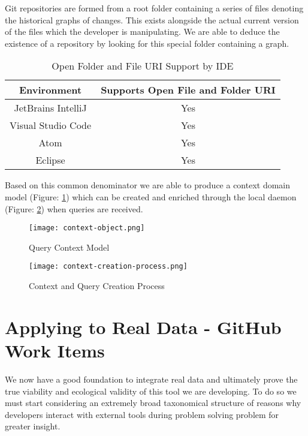 Git repositories are formed from a root folder containing a series of files denoting the historical graphs of changes. This exists alongside the actual current version of the files which the developer is manipulating. We are able to deduce the existence of a repository by looking for this special folder containing a graph.

\begin{table}[h!]
	\centering
	\begin{tabular}{|c|c|}
		\hline 
		Environment & Supports Open File and Folder URI \\ 
		\hline 
		\hline 
		JetBrains IntelliJ & Yes\\ 
		\hline 
		Visual Studio Code & Yes \\ 
		\hline 
		Atom & Yes  \\ 
		\hline 
		Eclipse & Yes \\ 
		\hline 
	\end{tabular} 
	\caption{Open Folder and File URI Support by IDE}
	\label{table:openFolderFileUriSupportByIDE}
\end{table}

Based on this common denominator we are able to produce a context domain model (Figure: \ref{fig:contextObject}) which can be created and enriched through the local daemon (Figure: \ref{fig:contextCreationProcess}) when queries are received.

\begin{figure}[h!]
	\centering
	\texttt{[image: context-object.png]}
	\caption{Query Context Model}
	\label{fig:contextObject}
\end{figure}


\begin{figure}[h!]
	\centering
	\texttt{[image: context-creation-process.png]}
	\caption{Context and Query Creation Process}
	\label{fig:contextCreationProcess}
\end{figure}
	
\section{Applying to Real Data - GitHub Work Items}

We now have a good foundation to integrate real data and ultimately prove the true viability and ecological validity of this tool we are developing. To do so we must start considering an extremely broad taxonomical structure of reasons why developers interact with external tools during problem solving problem for greater insight. 

